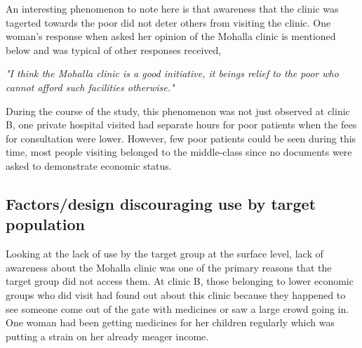 An interesting phenomenon to note here is that awareness that the clinic was tagerted towards the poor did not deter others from visiting the clinic. One woman's response when asked her opinion of the Mohalla clinic is mentioned below and was typical of other responses received, 

\textit{"I think the Mohalla clinic is a good initiative, it beings relief to the poor who cannot afford such facilities otherwise."}

During the course of the study, this phenomenon was not just observed at clinic B, one private hospital visited had separate hours for poor patients when the fees for consultation were lower. However, few poor patients could be seen during this time, most people visiting belonged to the middle-class since no documents were asked to demonstrate economic status.
\subsection{Factors/design discouraging use by target population} %
Looking at the lack of use by the target group at the surface level, lack of awareness about the Mohalla clinic was one of the primary reasons that the target group did not access them. At clinic B, those belonging to lower economic groups who did visit had found out about this clinic because they happened to see someone come out of the gate with medicines or saw a large crowd going in. One woman had been getting medicines for her children regularly which was putting a strain on her already meager income. 

